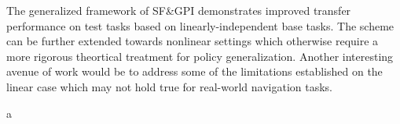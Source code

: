 \documentclass[11pt,letterpaper]{article}
\begin{document}
The generalized framework of SF\&GPI demonstrates improved transfer performance on test tasks based on linearly-independent base tasks. The scheme can be further extended towards nonlinear settings which otherwise require a more rigorous theortical treatment for policy generalization. Another interesting avenue of work would be to address some of the limitations established on the linear case which may not hold true for real-world navigation tasks. 

a
\end{document}
